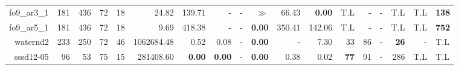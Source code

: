 \begin{table*}[t]
\begin{tabular}{|r|r|r|r|r||r||r|r|r|r|r||r|r|r|r|r|r|}
                       fo9\_ar3\_1 &          181 &           436 &           72 &            18 &               24.82 &         139.71 &              - &              - &          $\gg$ &          66.43 &  \textbf{0.00} &                T.L &                  - &                  - &                T.L &          T.L & \textbf{138} \\ 
                       fo9\_ar5\_1 &          181 &           436 &           72 &            18 &                9.69 &         418.38 &              - &              - &  \textbf{0.00} &         350.41 &         142.06 &                T.L &                  - &                  - &                T.L &          T.L & \textbf{752} \\ 
                          waternd2 &          233 &           250 &           72 &            46 &          1062684.48 &           0.52 &           0.08 &              - &  \textbf{0.00} &              - &           7.30 &                 33 &                 86 &                  - &        \textbf{26} &            - &          T.L \\ 
                         sssd12-05 &           96 &            53 &           75 &            15 &           281408.60 &  \textbf{0.00} &  \textbf{0.00} &              - &  \textbf{0.00} &           0.38 &           0.02 &        \textbf{77} &                 91 &                  - &                286 &          T.L &          T.L \\ 
\hline 
\end{tabular}\\ 
\label{table:results} 
\end{table*} 
 
